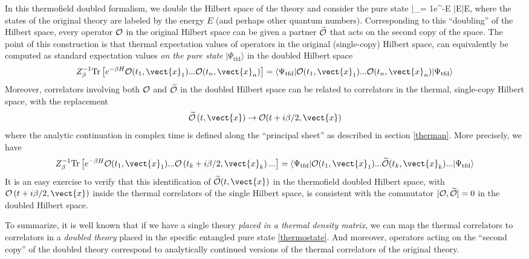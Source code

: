 In this thermofield doubled formalism, we double the Hilbert space of the theory and consider the pure state
\be
\label{thermostate}
|\Psi_{}\rangle = {1\over {}}\sum e^{-{\beta E }} |E\rangle \otimes |E\rangle,
\ee
where the states of the original theory are labeled by the energy $E$ (and perhaps other quantum numbers).  Corresponding to this ``doubling'' of the Hilbert space, every operator ${\cal O}$ in the original Hilbert space can be given a partner $\widetilde{\cal O}$ that acts on the second copy of the space. The point of this construction is that thermal
expectation values of operators in the original (single-copy) Hilbert space, can equivalently be computed as standard expectation values {\it on the  pure state} $|\Psi_{\text{tfd}}\rangle$ in the doubled Hilbert space
\[
 Z_{\beta}^{-1}{\rm Tr}\left[e^{-\beta H} {\cal O}(t_1,\vect{x}_1)...{\cal O}(t_n,\vect{x}_n) \right] = \langle \Psi_{\text{tfd}}| {\cal O}(t_1,\vect{x}_1)...{\cal O}(t_n,\vect{x}_n)|\Psi_{\text{tfd}}\rangle
\]
Moreover, correlators involving both ${\cal O}$ and $\widetilde{\cal O}$ in the doubled Hilbert space can be related to correlators
in the thermal, single-copy Hilbert space, with the replacement 
\[\widetilde{\cal O}\left(t,\vect{x})\rightarrow {\cal O}(t+i\beta/2,\vect{x}\right)\]
where the analytic continuation in complex time is defined  along the ``principal sheet''  as described in section \ref{therman}. More precisely, we have
\[
 Z_{\beta}^{-1}{\rm Tr}\left[e^{-\beta H} {\cal O}(t_1,\vect{x}_1)...{\cal O}\left(t_k+i\beta /2,\vect{x}_k\right)...\right] =
 \langle \Psi_{\text{tfd}}| {\cal O}(t_1,\vect{x}_1)...\widetilde{\cal O}(t_k,\vect{x}_k)...|\Psi_{\text{tfd}}\rangle
\]
It is an easy exercise to verify that this identification of $\widetilde{\cal O}(t,\vect{x})$ in the thermofield doubled Hilbert space, with ${\cal O}\left(t+i\beta/2,\vect{x}\right)$ inside the thermal correlators of the single Hilbert space, is consistent with the commutator $[{\cal O},\widetilde{\cal O}]=0$ in the doubled Hilbert space.

\vskip10pt

To summarize, it is well known that if we have a single theory {\it placed in a thermal density matrix}, we can map the thermal correlators to correlators in a {\it doubled theory} placed in the specific entangled pure state \eqref{thermostate}. And moreover, operators acting on the ``second copy'' of the doubled theory correspond to analytically continued versions of the thermal correlators of the original theory.  

